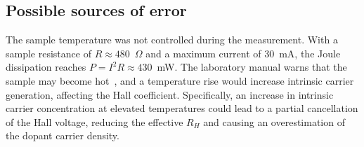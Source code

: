 \documentclass[%
 reprint,
 amsmath,amssymb,
 aps,
]{revtex4-2}
\begin{document}
\subsection{Possible sources of error}

The sample temperature was not controlled during the measurement. With a sample resistance of $R \approx 480$~$\Omega$ and a maximum current of 30~mA, the Joule dissipation reaches $P = I^2 R \approx 430$~mW. The laboratory manual warns that the sample may become hot~\cite{kaist-hall-manual}, and a temperature rise would increase intrinsic carrier generation, affecting the Hall coefficient. Specifically, an increase in intrinsic carrier concentration at elevated temperatures could lead to a partial cancellation of the Hall voltage, reducing the effective $R_H$ and causing an overestimation of the dopant carrier density.






\end{document}
